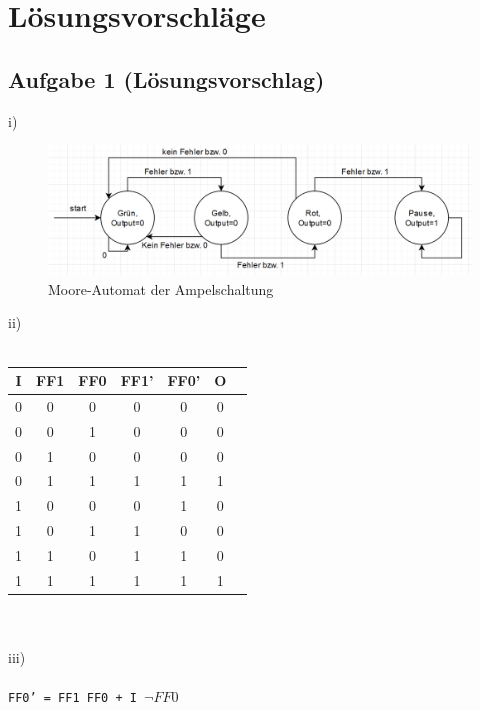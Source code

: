 \documentclass{article}
\begin{document}
\newpage

\section{Lösungsvorschläge}

\subsection{Aufgabe 1 (Lösungsvorschlag)}
i)
\begin{figure}[H]
\centering
\includegraphics[scale=0.45]{automat.png}
\caption{Moore-Automat der Ampelschaltung}
\end{figure}

ii) \\
\\
\begin{tabular}{c|c|c|c|c|c|c}
   I  & FF1 & FF0 & FF1' & FF0' & O \\
    \hline
   0   &  0   & 0   &   0   &   0   & 0  \\
    \hline
   0  &   0  &  1   &  0    &   0   &  0 \\
     \hline
   0  &  1   &  0   &   0   &   0   & 0  \\
     \hline
   0  &   1  &  1   &   1   &   1   & 1  \\
     \hline
   1  &  0   &  0   &   0   &   1   &  0 \\
     \hline
   1  &   0  &  1   &   1   &   0   &  0 \\
     \hline
   1  &  1   &  0   &   1   &   1   & 0  \\
     \hline
   1  &  1   &   1  &   1   &   1   &  1 \\
     \hline
\end{tabular} \\
 \\
iii) \\
\\
\texttt{FF0' = FF1 FF0 + I $\neg FF0$}
\label{sec:lsg01}
\end{document}
